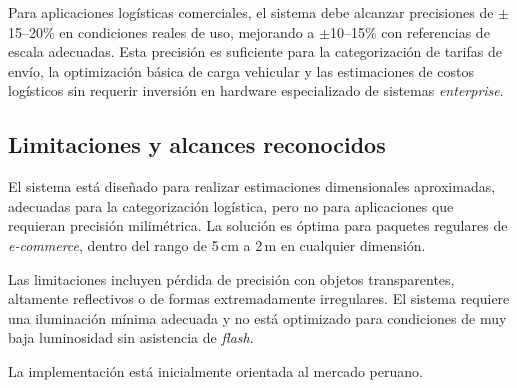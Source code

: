 Para aplicaciones logísticas comerciales, el sistema debe alcanzar precisiones de $\pm$15--20\% en condiciones reales de uso, mejorando a $\pm$10--15\% con referencias de escala adecuadas. Esta precisión es suficiente para la categorización de tarifas de envío, la optimización básica de carga vehicular y las estimaciones de costos logísticos sin requerir inversión en hardware especializado de sistemas \textit{enterprise}.

\subsection{Limitaciones y alcances reconocidos}

El sistema está diseñado para realizar estimaciones dimensionales aproximadas, adecuadas para la categorización logística, pero no para aplicaciones que requieran precisión milimétrica. La solución es óptima para paquetes regulares de \textit{e-commerce}, dentro del rango de 5\,cm a 2\,m en cualquier dimensión.

Las limitaciones incluyen pérdida de precisión con objetos transparentes, altamente reflectivos o de formas extremadamente irregulares. El sistema requiere una iluminación mínima adecuada y no está optimizado para condiciones de muy baja luminosidad sin asistencia de \textit{flash}.

La implementación está inicialmente orientada al mercado peruano.
